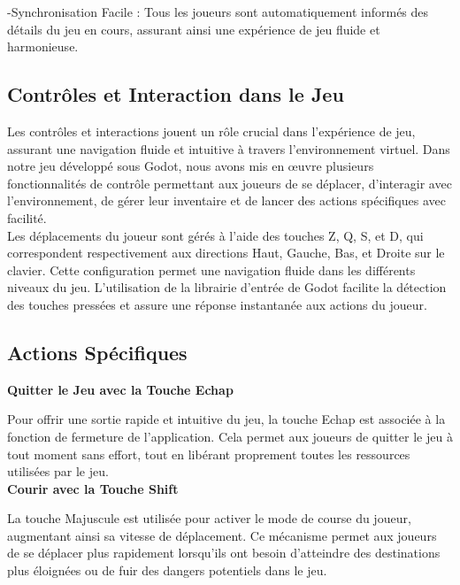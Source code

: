       -Synchronisation Facile : Tous les joueurs sont automatiquement informés des détails du jeu en cours, assurant ainsi une expérience de jeu fluide et harmonieuse.



      \subsection{Contrôles et Interaction dans le Jeu}

      Les contrôles et interactions jouent un rôle crucial dans l'expérience de jeu, 
      assurant une navigation fluide et intuitive à travers l'environnement virtuel. 
      Dans notre jeu développé sous Godot, nous avons mis en œuvre plusieurs fonctionnalités de contrôle permettant aux joueurs de se déplacer, 
      d'interagir avec l'environnement, de gérer leur inventaire et de lancer des actions spécifiques avec facilité.
      \\

      Les déplacements du joueur sont gérés à l'aide des touches Z, Q, S, et D, qui correspondent respectivement aux directions Haut, Gauche, Bas, et Droite sur le clavier. 
      Cette configuration permet une navigation fluide dans les différents niveaux du jeu. 
      L'utilisation de la librairie d'entrée de Godot facilite la détection des touches pressées et assure une réponse instantanée aux actions du joueur.

      \subsection*{Actions Spécifiques}
      \textbf{Quitter le Jeu avec la Touche Echap}

      Pour offrir une sortie rapide et intuitive du jeu, la touche Echap est associée à la fonction de fermeture de l'application. 
      Cela permet aux joueurs de quitter le jeu à tout moment sans effort, tout en libérant proprement toutes les ressources utilisées par le jeu.
      \\

      \textbf{Courir avec la Touche Shift}

      La touche Majuscule est utilisée pour activer le mode de course du joueur, augmentant ainsi sa vitesse de déplacement. Ce mécanisme permet aux joueurs de se déplacer plus rapidement lorsqu'ils ont besoin d'atteindre des destinations plus éloignées ou de fuir des dangers potentiels dans le jeu.
      \\

